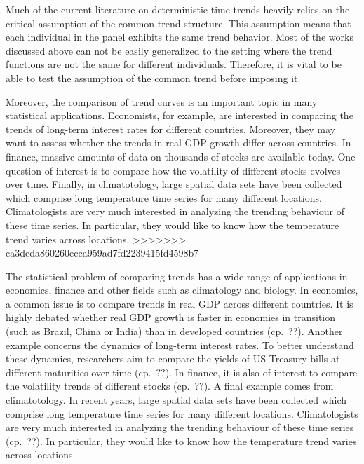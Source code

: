 \documentclass[a4paper,12pt]{article}
\begin{document}
Much of the current literature on deterministic time trends heavily relies on the critical assumption of the common trend structure. This assumption means that each individual in the panel exhibits the same trend behavior. Most of the works discussed above can not be easily generalized to the setting where the trend functions are not the same for different individuals. Therefore, it is vital to be able to test the assumption of the common trend before imposing it. 


Moreover, the comparison of trend curves is an important topic in many statistical applications. Economists, for example, are interested in comparing the trends of long-term interest rates for different countries. Moreover, they may want to assess whether the trends in real GDP growth differ across countries. In finance, massive amounts of data on thousands of stocks are available today. One question of interest is to compare how the volatility of different stocks evolves over time. Finally, in climatotology, large spatial data sets have been collected which comprise long temperature time series for many different locations. Climatologists are very much interested in analyzing the trending behaviour of these time series. In particular, they would like to know how the temperature trend varies across locations. 
>>>>>>> ca3deda860260ecca959ad7fd2239415fd4598b7

The statistical problem of comparing trends has a wide range of applications in economics, finance and other fields such as climatology and biology. In economics, a common issue is to compare trends in real GDP across different countries. It is highly debated whether real GDP growth is faster in economies in transition (such as Brazil, China or India) than in developed countries (cp.\ ??). Another example concerns the dynamics of long-term interest rates. To better understand these dynamics, researchers aim to compare the yields of US Treasury bills at different maturities over time (cp.\ ??). In finance, it is also of interest to compare the volatility trends of different stocks (cp.\ ??). A final example comes from climatotology. In recent years, large spatial data sets have been collected which comprise long temperature time series for many different locations. Climatologists are very much interested in analyzing the trending behaviour of these time series (cp.\ ??). In particular, they would like to know how the temperature trend varies across locations. 
\end{document}
